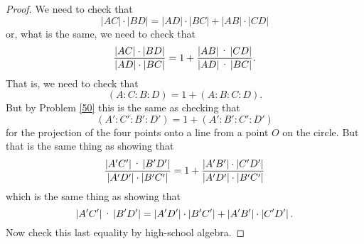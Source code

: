\documentclass{ximera}
\begin{document}
\begin{proof}
We need to check that%
\[
\left\vert AC\right\vert \cdot\left\vert BD\right\vert
=\left\vert AD\right\vert \cdot\left\vert BC\right\vert
+\left\vert AB\right\vert \cdot\left\vert CD\right\vert
\]
or, what is the same, we need to check that%
\[
\frac{\left\vert AC\right\vert \cdot\left\vert
BD\right\vert }{\left\vert AD\right\vert \cdot\left\vert
BC\right\vert }=1+\frac{\left\vert AB\right\vert \text{\textperiodcentered
}\left\vert CD\right\vert }{\left\vert AD\right\vert \text{\textperiodcentered
}\left\vert BC\right\vert }.
\]
That is, we need to check that
\[
\left(  A:C:B:D\right)  =1+\left(  A:B:C:D\right)  .
\]
But by Problem \ref{50} this is the same as checking that%
\[
\left(  A':C':B':D'\right)  =1+\left(
A':B':C':D'\right)
\]
for the projection of the four points onto a line from a point $O$ on the
circle. But that is the same thing as showing that
\[
\frac{\left\vert A'C'\right\vert \text{\textperiodcentered
}\left\vert B'D'\right\vert }{\left\vert A'D^{\prime
}\right\vert \cdot\left\vert B'C^{\prime
}\right\vert }=1+\frac{\left\vert A'B'\right\vert
\cdot\left\vert C'D'\right\vert
}{\left\vert A'D'\right\vert \cdot \left\vert B'C'\right\vert }%
\]
which is the same thing as showing that%
\[
\left\vert A'C'\right\vert \text{\textperiodcentered
}\left\vert B'D'\right\vert =\left\vert A'D^{\prime
}\right\vert \cdot\left\vert B'C^{\prime
}\right\vert +\left\vert A'B'\right\vert
\cdot\left\vert C'D'\right\vert .
\]
Now check this last equality by high-school algebra.
\end{proof}
\end{document}
